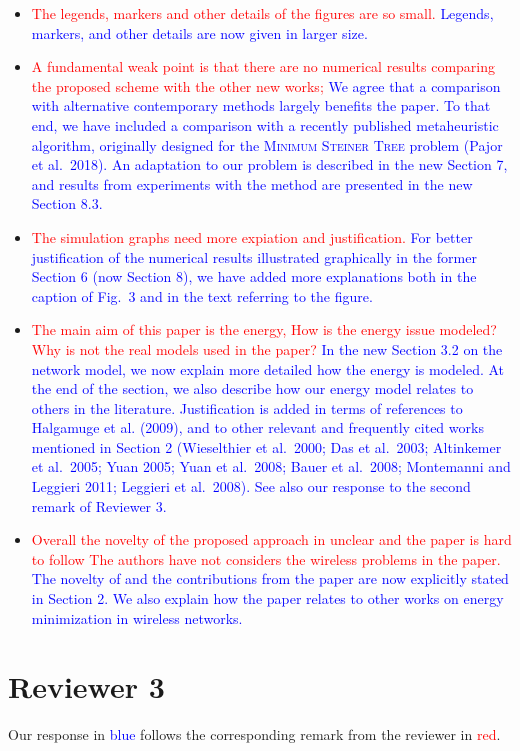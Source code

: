 \documentclass[12pt]{article}
\begin{document}
\begin{itemize}
{Done.
}
\item \textcolor{red}{The legends, markers and other details of the figures are so small.} \textcolor{blue}{
Legends, markers, and other details are now given in larger size.
}
\item \textcolor{red}{A fundamental weak point is that there are no numerical results comparing the proposed scheme with the other new works;} \textcolor{blue}{
We agree that a comparison with alternative contemporary methods largely benefits the paper.
To that end, we have included a comparison with a recently published metaheuristic algorithm,
originally designed for the \textsc{Minimum Steiner Tree} problem (Pajor et al.\ 2018).
An adaptation to our problem is described in the new Section 7, and results from experiments with the method are presented in the new Section 8.3.
}
\item \textcolor{red}{The simulation graphs need more expiation and justification.} \textcolor{blue}{
For better justification of the numerical results illustrated graphically in the former Section 6 (now Section 8),
we have added more explanations both in the caption of Fig.\ 3 and in the text referring to the figure.
}
\item \textcolor{red}{ The main aim of this paper is the energy, How is the energy issue modeled? Why is not the real models used in the paper?} \textcolor{blue}{
In the new Section 3.2 on the network model, we now explain more detailed how the energy is modeled.
At the end of the section, we also describe how our energy model relates to others in the literature.
Justification is added in terms of references to  Halgamuge et al. (2009), 
and to other relevant and frequently cited works mentioned in Section 2 (Wieselthier et al.\ 2000; Das et al.\ 2003; Altinkemer et al.\ 2005;
Yuan 2005; Yuan et al.\ 2008; Bauer et al.\ 2008; Montemanni and Leggieri 2011; Leggieri et al.\ 2008).
See also our response to the second remark of Reviewer 3.
}
\item \textcolor{red}{Overall the novelty of the proposed approach in unclear and the paper is hard to follow
The authors have not considers the wireless problems in the paper.} \textcolor{blue}{
The novelty of and the contributions from the paper are now explicitly stated in Section 2.
We also explain how the paper relates to other works on energy minimization in wireless networks.
}
\end{itemize}

\section*{Reviewer 3}
Our response in \textcolor{blue}{blue} follows the corresponding remark from the reviewer in \textcolor{red}{red}.
\end{document}
